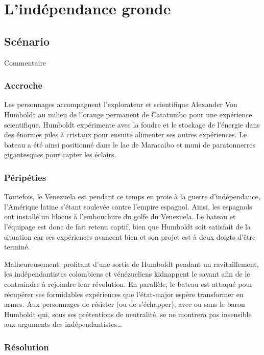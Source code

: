 \chapter{L'indépendance gronde}

\section{Scénario}

Commentaire

\subsection{Accroche}

Les personnages accompagnent l'explorateur et scientifique Alexander Von Humboldt au milieu de l'orange permanent de Catatumbo pour une expérience scientifique. Humboldt expérimente avec la foudre et le stockage de l'énergie dans des énormes piles à cristaux pour ensuite alimenter ses autres expériences. Le bateau a été ainsi positionné dans le lac de Maracaibo et muni de paratonnerres gigantesques pour capter les éclairs.

\subsection{Péripéties}

Toutefois, le Venezuela est pendant ce temps en proie à la guerre d'indépendance, l'Amérique latine s'étant soulevée contre l'empire espagnol. Ainsi, les espagnols ont installé un blocus à l'embouchure du golfe du Venezuela. Le bateau et l'équipage est donc de fait retenu captif, bien que Humboldt soit satisfait de la situation car ses expériences avancent bien et son projet est à deux doigts d'être terminé.

Malheureusement, profitant d'une sortie de Humboldt pendant un ravitaillement, les indépendantistes colombiens et vénézueliens kidnappent le savant afin de le contraindre à rejoindre leur révolution. En parallèle, le bateau est attaqué pour récupérer ses formidables expériences que l'état-major espère transformer en armes. Aux personnages de résister (ou de s'échapper), avec ou sans le baron Humboldt qui, sous ses prétentions de neutralité, se ne montrera pas insensible aux arguments des indépendantistes…

\subsection{Résolution}


